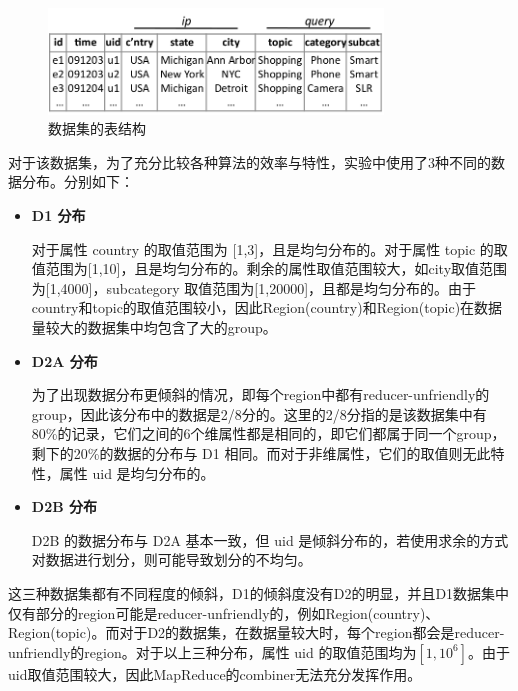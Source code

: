 \begin{figure}[!htb]
\centering\includegraphics[width=3.5in]{picture/ch_datacube_mr/dataset_table} 
\caption{数据集的表结构}\label{dataset_table} 
\end{figure} 


对于该数据集，为了充分比较各种算法的效率与特性，实验中使用了3种不同的数据分布。分别如下：
\begin{itemize}

\item \textbf{D1 分布}

对于属性 country 的取值范围为 [1,3]，且是均匀分布的。对于属性 topic 的取值范围为[1,10]，且是均匀分布的。剩余的属性取值范围较大，如city取值范围为[1,4000]，subcategory 取值范围为[1,20000]，且都是均匀分布的。由于country和topic的取值范围较小，因此Region(country)和Region(topic)在数据量较大的数据集中均包含了大的group。

\item \textbf{D2A 分布}

为了出现数据分布更倾斜的情况，即每个region中都有reducer-unfriendly的group，因此该分布中的数据是2/8分的。这里的2/8分指的是该数据集中有80\%的记录，它们之间的6个维属性都是相同的，即它们都属于同一个group，剩下的20\%的数据的分布与 D1 相同。而对于非维属性，它们的取值则无此特性，属性 uid 是均匀分布的。

\item \textbf{D2B 分布}

D2B 的数据分布与 D2A 基本一致，但 uid 是倾斜分布的，若使用求余的方式对数据进行划分，则可能导致划分的不均匀。

\end{itemize}

这三种数据集都有不同程度的倾斜，D1的倾斜度没有D2的明显，并且D1数据集中仅有部分的region可能是reducer-unfriendly的，例如Region(country)、Region(topic)。而对于D2的数据集，在数据量较大时，每个region都会是reducer-unfriendly的region。对于以上三种分布，属性 uid 的取值范围均为$[1,{10}^{6}]$。由于uid取值范围较大，因此MapReduce的combiner无法充分发挥作用。

